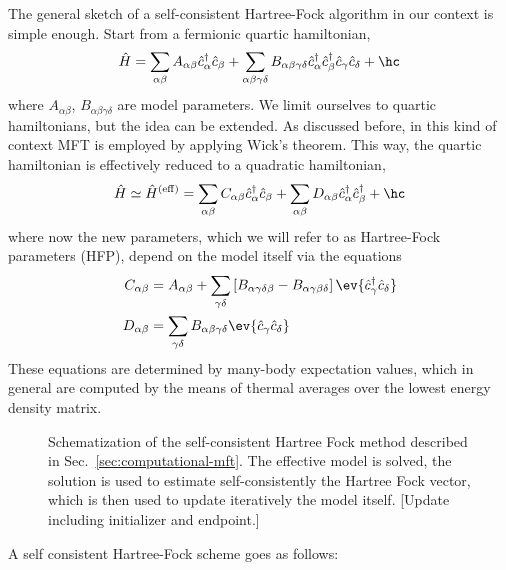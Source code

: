 The general sketch of a self-consistent Hartree-Fock algorithm in our context is simple enough. Start from a fermionic quartic hamiltonian,
\begin{equation}\label{eq:generic-quartic-hamiltonian}
	\hat H = \sum_{\alpha\beta} A_{\alpha\beta} \hat c_\alpha^\dagger \hat c_\beta + \sum_{\alpha\beta\gamma\delta} B_{\alpha\beta\gamma\delta} \hat c_\alpha^\dagger \hat c_\beta^\dagger \hat c_\gamma \hat c_\delta + \hc
\end{equation}
where $A_{\alpha\beta}$, $B_{\alpha\beta\gamma\delta}$ are model parameters. We limit ourselves to quartic hamiltonians, but the idea can be extended. As discussed before, in this kind of context MFT is employed by applying Wick's theorem. This way, the quartic hamiltonian is effectively reduced to a quadratic hamiltonian,
\begin{equation}\label{eq:generic-quadratic-effective-hamiltonian}
	\hat H \simeq \hat H^{(\mathrm{eff})} = 
	\sum_{\alpha\beta} C_{\alpha\beta} \hat c_\alpha^\dagger \hat c_\beta + \sum_{\alpha\beta} D_{\alpha\beta} \hat c_\alpha^\dagger \hat c_\beta^\dagger + \hc
\end{equation}
where now the new parameters, which we will refer to as Hartree-Fock parameters (HFP), depend on the model itself via the equations
\[
\begin{aligned}
	C_{\alpha\beta} &= A_{\alpha\beta} + \sum_{\gamma\delta} \left[
		B_{\alpha\gamma\delta\beta} - B_{\alpha\gamma\beta\delta} 
	\right] \ev{
		\hat c_\gamma^\dagger \hat c_\delta
	} \\
	D_{\alpha\beta} &= \sum_{\gamma\delta} B_{\alpha\beta\gamma\delta} \ev{
		\hat c_\gamma \hat c_\delta
	}
\end{aligned}
\]
These equations are determined by many-body expectation values, which in general are computed by the means of thermal averages over the lowest energy density matrix.
%
\begin{figure}
	\centering
	
	\caption{Schematization of the self-consistent Hartree Fock method described in Sec.~\ref{sec:computational-mft}. The effective model is solved, the solution is used to estimate self-consistently the Hartree Fock vector, which is then used to update iteratively the model itself. {\color{tabred}[Update including initializer and endpoint.]}}
	\label{fig:effective-model-scheme}
\end{figure}
%
A self consistent Hartree-Fock scheme goes as follows:

